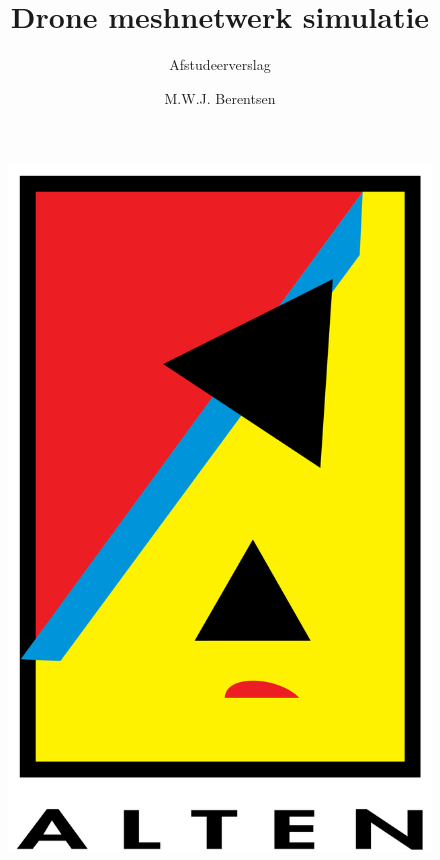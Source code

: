 \documentclass[a4paper, 11pt, oneside]{report}
\author{M.W.J. Berentsen}
\title{\myfont Drone meshnetwerk simulatie}
\subtitle{Afstudeerverslag}{Versie 2.0}{Alten Nederland B.V.}{Hogeschool van Arnhem en Nijmegen}{HBO Technische Informatica - Embedded Software Developement }{MWJ.Berentsen@student.han.nl}{Studentnummer: 561399}{Docent: J. Visch, MSc}{Assessor: ir. C.G.R. van Uffelen}
\begin{document}
\begin{figure}
\begin{center}\includegraphics[scale=0.1]{alten}\end{center}
\end{figure}
\maketitle

\end{document}
